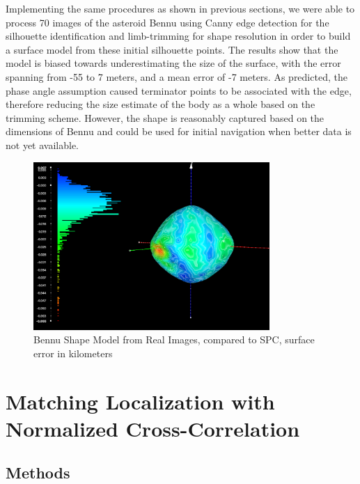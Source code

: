 Implementing the same procedures as shown in previous sections, we were able to process 70 images of the asteroid Bennu using Canny edge detection for the silhouette identification and limb-trimming for shape resolution in order to build a surface model from these initial silhouette points. The results show that the model is biased towards underestimating the size of the surface, with the error spanning from -55 to 7 meters, and a mean error of -7 meters. As predicted, the phase angle assumption caused terminator points to be associated with the edge, therefore reducing the size estimate of the body as a whole based on the trimming scheme. However, the shape is reasonably captured based on the dimensions of Bennu and could be used for initial navigation when better data is not yet available.  

\begin{figure}[H]
    \centering
    \includegraphics[width = 0.8\textwidth]{fig/bennu_real.png}
    \caption{Bennu Shape Model from Real Images, compared to SPC, surface error in kilometers}
    \label{fig:bennu_real}
\end{figure}


\section{Matching Localization with Normalized Cross-Correlation}
\subsection{Methods}

